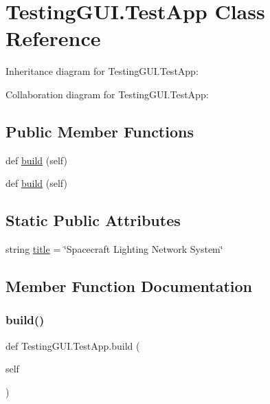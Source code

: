 \hypertarget{classTestingGUI_1_1TestApp}{}\section{Testing\+G\+U\+I.\+Test\+App Class Reference}
\label{classTestingGUI_1_1TestApp}


Inheritance diagram for Testing\+G\+U\+I.\+Test\+App\+:


Collaboration diagram for Testing\+G\+U\+I.\+Test\+App\+:
\subsection*{Public Member Functions}
\begin{DoxyCompactItemize}
\item 
def \hyperlink{classTestingGUI_1_1TestApp_ae400da04ab73e37a37943e36a1a90fd7}{build} (self)
\item 
def \hyperlink{classTestingGUI_1_1TestApp_ae400da04ab73e37a37943e36a1a90fd7}{build} (self)
\end{DoxyCompactItemize}
\subsection*{Static Public Attributes}
\begin{DoxyCompactItemize}
\item 
string \hyperlink{classTestingGUI_1_1TestApp_a8ed3f749511e756286c7216e71665c65}{title} = \char`\"{}Spacecraft Lighting Network System\char`\"{}
\end{DoxyCompactItemize}


\subsection{Member Function Documentation}
\mbox{\label{classTestingGUI_1_1TestApp_ae400da04ab73e37a37943e36a1a90fd7}} 
\subsubsection{\texorpdfstring{build()}{build()}\hspace{0.1cm}{\footnotesize\ttfamily [1/2]}}
{\footnotesize\ttfamily def Testing\+G\+U\+I.\+Test\+App.\+build (\begin{DoxyParamCaption}\item[{}]{self }\end{DoxyParamCaption})}

